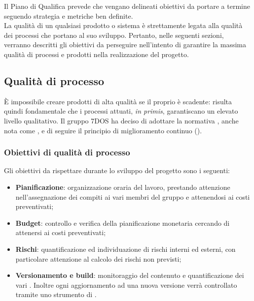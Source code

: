 Il Piano di Qualifica prevede che vengano delineati obiettivi da portare a termine seguendo strategia e metriche ben definite.\\
La qualità di un qualsiasi prodotto o sistema è strettamente legata alla qualità dei processi che portano al suo sviluppo. Pertanto, nelle seguenti sezioni, verranno descritti gli obiettivi da perseguire nell'intento di garantire la massima qualità di processi e prodotti nella realizzazione del progetto.

\subsection{Qualità di processo}
	È impossibile creare prodotti di alta qualità se il proprio  è scadente: risulta quindi fondamentale che i processi attuati, \emph{in primis}, garantiscano un elevato livello qualitativo. Il gruppo 7DOS ha deciso di adottare la normativa , anche nota come , e di seguire il principio di miglioramento continuo (). 


\subsubsection{Obiettivi di qualità di processo}

Gli obiettivi da rispettare durante lo sviluppo del progetto sono i seguenti:

\begin{itemize}
	\item{\textbf{Pianificazione}: organizzazione oraria del lavoro, prestando attenzione nell'assegnazione dei compiti ai vari membri del gruppo e attenendosi ai costi preventivati;
	}
	\item{\textbf{Budget}: controllo e verifica della pianificazione monetaria cercando di attenersi ai costi preventivati;
	}
	\item{\textbf{Rischi}: quantificazione ed individuazione di rischi interni ed esterni, con particolare attenzione al calcolo dei rischi non previsti;
	}
	\item{\textbf{Versionamento e build}: monitoraggio del contenuto e quantificazione dei vari . Inoltre ogni aggiornamento ad una nuova versione verrà controllato tramite uno strumento di .
	}
\end{itemize}

